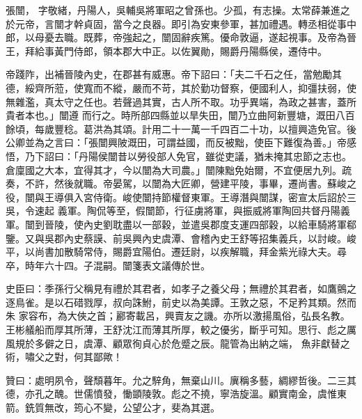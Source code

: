 \begin{pinyinscope}
 張闓，
 字敬緒，丹陽人，吳輔吳將軍昭之曾孫也。少孤，有志操。太常薛兼進之於元帝，言闓才幹貞固，當今之良器。即引為安東參軍，甚加禮遇。轉丞相從事中郎，以母憂去職。既葬，帝強起之，闓固辭疾篤。優命敦逼，遂起視事。及帝為晉王，拜給事黃門侍郎，領本郡大中正。以佐翼勛，賜爵丹陽縣侯，遷侍中。



 帝踐阼，出補晉陵內史，在郡甚有威惠。帝下詔曰：「夫二千石之任，當勉勵其德，綏齊所蒞，使寬而不縱，嚴而不苛，其於勤功督察，便國利人，抑彊扶弱，使無雜濫，真太守之任也。若聲過其實，古人所不取。功乎異端，為政之甚害，蓋所貴者本也。」闓遵
 而行之。時所部四縣並以旱失田，闓乃立曲阿新豐塘，溉田八百餘頃，每歲豐稔。葛洪為其頌。計用二十一萬一千四百二十功，以擅興造免官。後公卿並為之言曰：「張闓興陂溉田，可謂益國，而反被黜，使臣下難復為善。」帝感悟，乃下詔曰：「丹陽侯闓昔以勞役部人免官，雖從吏議，猶未掩其忠節之志也。倉廩國之大本，宜得其才，今以闓為大司農。」闓陳黜免始爾，不宜便居九列。疏奏，不許，然後就職。帝晏駕，以闓為大匠卿，營建平陵，事畢，遷尚書。蘇峻之役，闓與王導俱入宮侍衛。峻使闓持節權督東軍。王導潛與闓謀，密宣太后詔於三吳，令速起
 義軍。陶侃等至，假闓節，行征虜將軍，與振威將軍陶回共督丹陽義軍。闓到晉陵，使內史劉耽盡以一部穀，並遣吳郡度支運四部穀，以給車騎將軍郗鑒。又與吳郡內史蔡謨、前吳興內史虞潭、會稽內史王舒等招集義兵，以討峻。峻平，以尚書加散騎常侍，賜爵宜陽伯。遷廷尉，以疾解職，拜金紫光祿大夫。尋卒，時年六十四。子混嗣。闓箋表文議傳於世。


史臣曰：季孫行父稱見有禮於其君者，如孝子之養父母；無禮於其君者，如鷹鸇之逐鳥雀。是以石碏戮厚，叔向誅鮒，前史以為美譚。王敦之惡，不足矜其類。然而朱
 家容布，為大俠之首；酈寄載呂，興賣友之譏。亦所以激揚風俗，弘長名教。王彬艤船而厚其所薄，王舒沈江而薄其所厚，較之優劣，斷乎可知。思行、彪之厲風規於多僻之日，虞潭、顧眾徇貞心於危蹙之辰。龍管為出納之端，
 魚非獻替之術，嘯父之對，何其鄙歟！



 贊曰：處明夙令，聲頹暮年。允之騂角，無棄山川。廙稱多藝，綢繆哲後。二三其德，亦孔之醜。世儒憤發，慟顗陵敦。彪之不撓，寧浩旋溫。顧實南金，虞惟東箭。銑質無改，筠心不變，公望公才，斐為其選。



\end{pinyinscope}